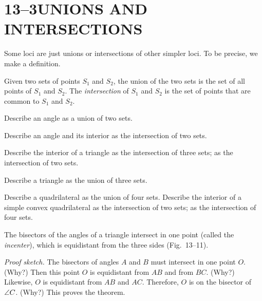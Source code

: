\documentclass[11pt]{book}
\begin{document}
\section*{13--3\quad UNIONS AND INTERSECTIONS}

Some loci are just unions or intersections of other simpler loci. To be precise,
we make a definition.

\begin{definition}
Given two sets of points $S_1$ and $S_2$, the union of the two sets is the set of
all points of $S_1$ and $S_2$. The \emph{intersection} of $S_1$ and $S_2$ is the
set of points that are common to $S_1$ and $S_2$.
\end{definition}


\begin{exercisecols}
\begin{exlist}
\item Describe an angle as a union of two sets.
\item Describe an angle and its interior as the intersection of two sets.
\item Describe the interior of a triangle as the intersection of three sets; as
      the intersection of two sets.
\item Describe a triangle as the union of three sets.
\item Describe a quadrilateral as the union of four sets. Describe the interior
      of a simple convex quadrilateral as the intersection of two sets; as the
      intersection of four sets.
\end{exlist}
\end{exercisecols}

\begin{theorem}
The bisectors of the angles of a triangle intersect in one point (called the
\emph{incenter}), which is equidistant from the three sides (Fig.~13--11).
\end{theorem}

\FIGXIIIELEVEN

\noindent\emph{Proof sketch.} The bisectors of angles $A$ and $B$ must intersect
in one point $O$. (Why?) Then this point $O$ is equidistant from $AB$ and from
$BC$. (Why?) Likewise, $O$ is equidistant from $AB$ and $AC$. Therefore, $O$ is
on the bisector of $\angle C$. (Why?) This proves the theorem.
\end{document}
